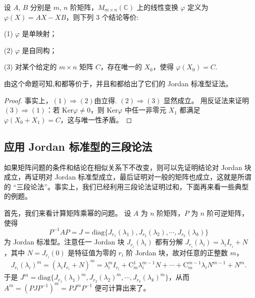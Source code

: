 \documentclass[../../main.tex]{subfiles}
\begin{document}
\begin{proposition}\label{proposition:AX-XB线性映射相关等价条件}
设 $A$, $B$ 分别是 $m$, $n$ 阶矩阵，$M_{m\times n}(\mathbb{C})$ 上的线性变换 $\varphi$ 定义为 $\varphi(X) = AX - XB$，则下列 3 个结论等价:

(1) $\varphi$ 是单映射；

(2) $\varphi$ 是自同构；

(3) 对某个给定的 $m \times n$ 矩阵 $C$，存在唯一的 $X_0$，使得 $\varphi(X_0) = C$.
\end{proposition}
\begin{remark}
由这个命题可知,和都等价于，并且和都给出了它们的 Jordan 标准型证法。
\end{remark}
\begin{proof}
事实上，$(1) \Rightarrow (2)$由立得. 
$(2) \Rightarrow (3)$ 显然成立。
用反证法来证明 $(3) \Rightarrow (1)$：若 $\mathrm{Ker}\varphi \neq 0$，则 $\mathrm{Ker}\varphi$ 中任一非零元 $X_1$ 都满足 $\varphi(X_0 + X_1) = C$，这与唯一性矛盾。
\end{proof}

\subsection{应用 Jordan 标准型的三段论法}
 
如果矩阵问题的条件和结论在相似关系下不改变，则可以先证明结论对 Jordan 块成立，再证明对 Jordan 标准型成立，最后证明对一般的矩阵也成立，这就是所谓的 “三段论法”。事实上，我们已经利用三段论法证明过和，下面再来看一些典型的例题。

首先，我们来看计算矩阵乘幂的问题。
设 $A$ 为 $n$ 阶矩阵，$P$ 为 $n$ 阶可逆矩阵，使得 
\[
P^{-1}AP = J = \mathrm{diag}\{J_{r_1}(\lambda_1), J_{r_2}(\lambda_2), \cdots, J_{r_k}(\lambda_k)\}
\] 
为 Jordan 标准型。注意任一 Jordan 块 $J_{r_i}(\lambda_i)$ 都有分解 $J_{r_i}(\lambda_i) = \lambda_i I_{r_i} + N$，其中 $N = J_{r_i}(0)$ 是特征值为零的 $r_i$ 阶 Jordan 块，故对任意的正整数 $m$，
\begin{align*}
J_{r_i}(\lambda_i)^m = (\lambda_i I_{r_i} + N)^m = \lambda_i^m I_{r_i} + \mathrm{C}_m^1 \lambda_i^{m - 1} N + \cdots + \mathrm{C}_m^{m - 1} \lambda_i N^{m - 1} + N^m.
\end{align*}
于是 $J^m = \mathrm{diag}\{J_{r_1}(\lambda_1)^m, J_{r_2}(\lambda_2)^m, \cdots, J_{r_k}(\lambda_k)^m\}$，从而 $A^m = (PJP^{-1})^m = PJ^mP^{-1}$ 便可计算出来了。 
\end{document}
